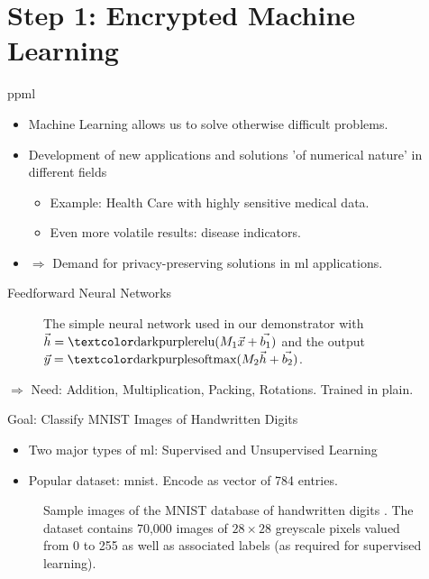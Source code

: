 \section{Step 1: Encrypted Machine Learning}
\begin{frame}{\gls{ppml}}
  \begin{itemize}
    \item Machine Learning allows us to solve otherwise difficult problems.
    \item Development of new applications and solutions 'of numerical nature' in different fields
          \begin{itemize}
            \item Example: Health Care with highly sensitive medical data.
            \item Even more volatile results: disease indicators.
          \end{itemize}
    \item $\Rightarrow$ Demand for privacy-preserving solutions in \gls{ml} applications.
  \end{itemize}
\end{frame}

\begin{frame}{Feedforward Neural Networks}
  \begin{figure}[H]
    \centering
    \caption[Neural Network illustration resembling the one used in our demonstrator]{
      The simple neural network used in our demonstrator with $\vec{h} = \cryptop{relu}(M_1 \vec{x} + \vec{b_1})$ and the output $\vec{y} = \cryptop{softmax}(M_2 \vec{h} + \vec{b_2})$.
    }
    \label{fig:neural-network}
  \end{figure}
  \vspace{6pt}
  $\Rightarrow$ Need: Addition, Multiplication, Packing, Rotations. Trained in plain.
\end{frame}

\begin{frame}{Goal: Classify MNIST Images of Handwritten Digits}
  \begin{itemize}
    \item Two major types of \gls{ml}: Supervised and Unsupervised Learning
    \item Popular dataset: \gls{mnist}. Encode as vector of 784 entries.
  \end{itemize}

  \begin{figure}[H]
    \centering
    \caption[Sample images of the MNIST dataset]{
      Sample images of the MNIST database of handwritten digits \parencite{mnist-original}.
      The dataset contains 70,000 images of $28 \times 28$ greyscale pixels valued from 0 to 255 as well as associated labels (as required for supervised learning).
    }
    \label{fig:mnist}
  \end{figure}
\end{frame}

